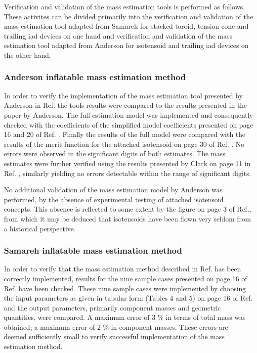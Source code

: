 Verification and validation of the mass estimation tools is performed as follows. These activites can be divided primarily into the verification and validation of the mass estimation tool adapted from Samareh \cite{Samareh2011} for stacked toroid, tension cone and trailing \gls{iad} devices on one hand and verification and validation of the mass estimation tool adapted from Anderson \cite{Anderson1969} for isotensoid and trailing \gls{iad} devices on the other hand. 

\subsubsection{Anderson inflatable mass estimation method}
In order to verify the implementation of the mass estimation tool presented by Anderson in Ref. \cite{Anderson1969} the tools results were compared to the results presented in the paper by Anderson. The full estimation model was implemented and consequently checked with the coefficients of the simplified model coefficients presented on page 16 and 20 of Ref. \cite{Anderson1969}. Finally the results of the full model were compared with the results of the merit function for the attached isotensoid on page 30 of Ref. \cite{Anderson1969}. No errors were observed in the significant digits of both estimates. The mass estimates were further verified using the results presented by Clark on page 11 in Ref. \cite{Clark2009}, similarly yielding no errors detectable within the range of significant digits.

No additional validation of the mass estimation model by Anderson \cite{Anderson1969} was performed, by the absence of experimental testing of attached isotensoid concepts. This absence is reflected to some extent by the figure on page 3 of Ref.\cite{Smith2010}, from which it may be deduced that isotensoids have been flown very seldom from a historical perspective.

\subsubsection{Samareh inflatable mass estimation method}
In order to verify that the mass estimation method described in Ref.\cite{Samareh2011} has been correctly implemented, results for the nine sample cases presented on page 16 of Ref.\cite{Samareh2011} have been checked. These nine sample cases were implemented by choosing the input parameters as given in tabular form (Tables 4 and 5) on page 16 of Ref.\cite{Samareh2011} and the output parameters, primarily component masses and geometric quantities, were compared. A maximum error of 3 $\%$ in terms of total mass was obtained; a maximum error of 2 $\%$ in component masses. These errors are deemed sufficiently small to verify successful implementation of the mass estimation method.

